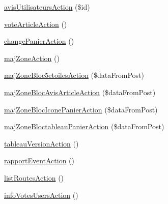 \begin{DoxyCompactItemize}
\item 
\hyperlink{class_acme_group_1_1_site_bundle_1_1_controller_1_1_site_controller_a20082ea55861f87cc207baa8ca188abf}{avis\+Utilisateurs\+Action} (\$id)
\item 
\hyperlink{class_acme_group_1_1_site_bundle_1_1_controller_1_1_site_controller_a2a98909ec03b1166e11c621a80771cb5}{vote\+Article\+Action} ()
\item 
\hyperlink{class_acme_group_1_1_site_bundle_1_1_controller_1_1_site_controller_a874a972a153a106feb2a0177468ff45b}{change\+Panier\+Action} ()
\item 
\hyperlink{class_acme_group_1_1_site_bundle_1_1_controller_1_1_site_controller_ad664f50bd3a6c67ac25e0ac2a64bc2ec}{maj\+Zone\+Action} ()
\item 
\hyperlink{class_acme_group_1_1_site_bundle_1_1_controller_1_1_site_controller_a65b5f32568473c1480783f6b0db59163}{maj\+Zone\+Bloc5etoiles\+Action} (\$data\+From\+Post)
\item 
\hyperlink{class_acme_group_1_1_site_bundle_1_1_controller_1_1_site_controller_ace92e20f96e474ac43a74c34fb390815}{maj\+Zone\+Bloc\+Avis\+Article\+Action} (\$data\+From\+Post)
\item 
\hyperlink{class_acme_group_1_1_site_bundle_1_1_controller_1_1_site_controller_abde9fc2237c741abe41c2ca78bcbf609}{maj\+Zone\+Bloc\+Icone\+Panier\+Action} (\$data\+From\+Post)
\item 
\hyperlink{class_acme_group_1_1_site_bundle_1_1_controller_1_1_site_controller_aa67a59e6f47e24e86ef617a155bf92e6}{maj\+Zone\+Bloctableau\+Panier\+Action} (\$data\+From\+Post)
\item 
\hyperlink{class_acme_group_1_1_site_bundle_1_1_controller_1_1_site_controller_a0fffe3df03fe4ae5b47be1d041c2a627}{tableau\+Version\+Action} ()
\item 
\hyperlink{class_acme_group_1_1_site_bundle_1_1_controller_1_1_site_controller_a919cf93e68595470d4ebf83447c0fc38}{rapport\+Event\+Action} ()
\item 
\hyperlink{class_acme_group_1_1_site_bundle_1_1_controller_1_1_site_controller_ad023327c61da83f5918c9b953ceeb471}{list\+Routes\+Action} ()
\item 
\hyperlink{class_acme_group_1_1_site_bundle_1_1_controller_1_1_site_controller_a05d73fcf80cb98e1b7cc00c397bf92ad}{info\+Votes\+Users\+Action} ()
\end{DoxyCompactItemize}


